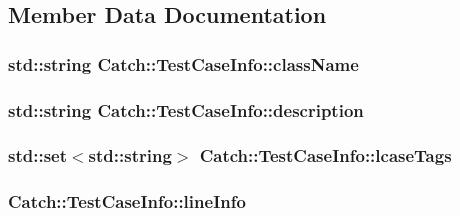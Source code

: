 \subsection{Member Data Documentation}
\hypertarget{struct_catch_1_1_test_case_info_a1a5e0825132a38d091defdebbf2f8ce9}{
\subsubsection[{class\-Name}]{\setlength{\rightskip}{0pt plus 5cm}std\-::string Catch\-::\-Test\-Case\-Info\-::class\-Name}}\label{struct_catch_1_1_test_case_info_a1a5e0825132a38d091defdebbf2f8ce9}
\hypertarget{struct_catch_1_1_test_case_info_a37fe2db9425bc45f6a33893eac31198e}{
\subsubsection[{description}]{\setlength{\rightskip}{0pt plus 5cm}std\-::string Catch\-::\-Test\-Case\-Info\-::description}}\label{struct_catch_1_1_test_case_info_a37fe2db9425bc45f6a33893eac31198e}
\hypertarget{struct_catch_1_1_test_case_info_a0ed3864a313e8ddc3ae38431be5be9ae}{
\subsubsection[{lcase\-Tags}]{\setlength{\rightskip}{0pt plus 5cm}std\-::set$<$std\-::string$>$ Catch\-::\-Test\-Case\-Info\-::lcase\-Tags}}\label{struct_catch_1_1_test_case_info_a0ed3864a313e8ddc3ae38431be5be9ae}
\hypertarget{struct_catch_1_1_test_case_info_aa9407b7f442655b51a2aad24b3fa2fd3}{
\subsubsection[{line\-Info}]{ Catch\-::\-Test\-Case\-Info\-::line\-Info}}\label{struct_catch_1_1_test_case_info_aa9407b7f442655b51a2aad24b3fa2fd3}
